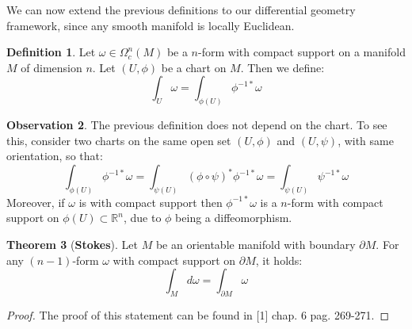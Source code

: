 \documentclass[12pt,a4paper]{report}
\theoremstyle{definition}
\newtheorem{Def}{Definition}[chapter]
\theoremstyle{Theorem}
\newtheorem{Theo}[Def]{Theorem}
\theoremstyle{definition}
\theoremstyle{definition}
\newtheorem{Obs}[Def]{Observation}
\begin{document}
	We can now extend the previous definitions to our differential geometry framework, since any smooth manifold is locally Euclidean.
	\begin{Def}
		Let $\omega\in\Omega^n_c(M)$ be a $n$-form with compact support on a manifold $M$ of dimension $n$. Let $(U,\phi)$ be a chart on $M$. Then we define:
		$$\int_U\omega=\int_{\phi(U)}\phi^{-1*}\omega$$
	\end{Def}
	\begin{Obs}
		The previous definition does not depend on the chart. To see this, consider two charts on the same open set $(U,\phi)$ and $(U,\psi)$, with same orientation, so that:
		$$\int_{\phi(U)}\phi^{-1*}\omega=\int_{\psi(U)}(\phi\circ\psi)^*\phi^{-1*}\omega=\int_{\psi(U)}\psi^{-1*}\omega$$
		Moreover, if $\omega$ is with compact support then $\phi^{-1*}\omega$ is a $n$-form with compact support on $\phi(U)\subset\mathbb{R}^n$, due to $\phi$ being a diffeomorphism. 
	\end{Obs}
	\begin{Theo}[\textbf{Stokes}]
		Let $M$ be an orientable manifold with boundary $\partial M$. For any $(n-1)$-form $\omega$ with compact support on $\partial M$, it holds:
		$$\int_M d\omega=\int_{\partial M}\omega$$ 
	\end{Theo}
	\begin{proof}
		The proof of this statement can be found in [1] chap. 6 pag. 269-271.
	\end{proof}
\end{document}
